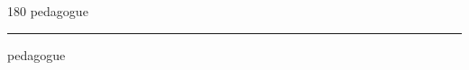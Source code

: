 
\begin{frame}
\begin{center}
\begin{turn}{180}
{\fontsize{2.5cm}{1em}\selectfont pedagogue}
\end{turn}
\vspace{1em}\par  
\hrule
\vspace{1em}\par  
{\fontsize{2.5cm}{1em}\selectfont pedagogue}
\end{center}
\end{frame}
